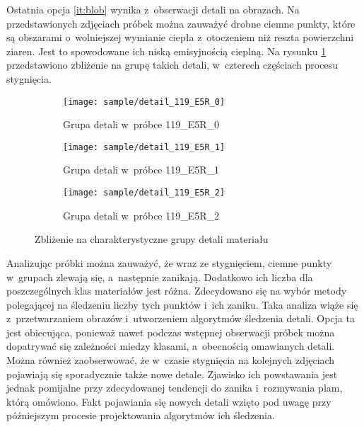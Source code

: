 Ostatnia opcja \ref{it:blob} wynika z~obserwacji detali na obrazach.
Na przedstawionych zdjęciach próbek można zauważyć drobne ciemne punkty,
które są obszarami o~wolniejszej wymianie ciepła z~otoczeniem niż reszta
powierzchni ziaren.
Jest to spowodowane ich niską emisyjnością cieplną.
Na rysunku \ref{fig:blob_detail} przedstawiono zbliżenie na grupę takich
detali, w~czterech częściach procesu stygnięcia.
\begin{figure}[htb]
	\centering
	\begin{subfigure}{0.3\textwidth}
		\centering
		\texttt{[image: sample/detail\_119\_E5R\_0]}
		\caption{Grupa detali w~próbce 119\_E5R\_0}
	\end{subfigure}
	\hspace{0.25cm}
	\centering
	\begin{subfigure}{0.3\textwidth}
		\centering
		\texttt{[image: sample/detail\_119\_E5R\_1]}
		\caption{Grupa detali w~próbce 119\_E5R\_1}
	\end{subfigure}
	\hspace{0.24cm}
	\begin{subfigure}{0.3\textwidth}
		\centering
		\texttt{[image: sample/detail\_119\_E5R\_2]}
		\caption{Grupa detali w~próbce 119\_E5R\_2}
	\end{subfigure}
	\caption{Zbliżenie na charakterystyczne grupy detali materiału}
	\label{fig:blob_detail}
\end{figure}

Analizując próbki można zauważyć, że wraz ze stygnięciem, ciemne punkty
w~grupach zlewają się, a~następnie zanikają.
Dodatkowo ich liczba dla poszczególnych klas materiałów jest różna.
Zdecydowano się na wybór metody polegającej na śledzeniu liczby tych punktów
i~ich zaniku.
Taka analiza wiąże się z~przetwarzaniem obrazów i~utworzeniem algorytmów
śledzenia detali.
Opcja ta jest obiecująca, ponieważ nawet podczas wstępnej obserwacji próbek
można dopatrywać się zależności miedzy klasami, a~obecnością omawianych
detali.
Można również zaobserwować, że w~czasie stygnięcia na kolejnych zdjęciach
pojawiają się sporadycznie także nowe detale.
Zjawisko ich powstawania jest jednak pomijalne przy zdecydowanej tendencji
do zanika i~rozmywania plam, którą omówiono.
Fakt pojawiania się nowych detali wzięto pod uwagę przy późniejszym procesie
projektowania algorytmów ich śledzenia.


